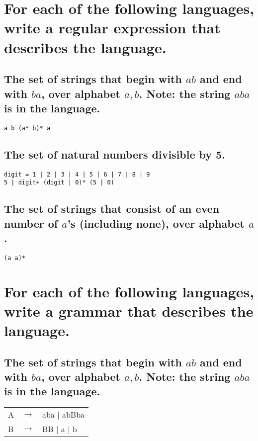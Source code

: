 \documentclass[letterpaper]{article}
\begin{document}
\section{For each of the following languages, write a regular expression that describes the language.}
\subsection{The set of strings that begin with $ab$ and end with $ba$, over alphabet ${a, b}$. Note: the string $aba$ is in the language.}
\begin{adjustwidth}{2.35em}{0pt}
\begin{verbatim}
a b (a* b)* a
\end{verbatim}
\end{adjustwidth}
\subsection{The set of natural numbers divisible by 5.}
\begin{adjustwidth}{2.35em}{0pt}
\begin{verbatim}
digit = 1 | 2 | 3 | 4 | 5 | 6 | 7 | 8 | 9
5 | digit+ (digit | 0)* (5 | 0)
\end{verbatim}
\end{adjustwidth}
\subsection{The set of strings that consist of an even number of $a$’s (including none), over alphabet ${a}$.}
\begin{adjustwidth}{2.35em}{0pt}
\begin{verbatim}
(a a)*
\end{verbatim}
\end{adjustwidth}

\section{For each of the following languages, write a grammar that describes the language.}
\subsection{The set of strings that begin with $ab$ and end with $ba$, over alphabet ${a, b}$. Note: the string $aba$ is in the language.}
\begin{adjustwidth}{2.35em}{0pt}
\begin{tabular}{l c l}
A & $\rightarrow$ & aba $|$ abBba \\
B & $\rightarrow$ & BB $|$ a $|$ b
\end{tabular}
\end{adjustwidth}
\end{document}
